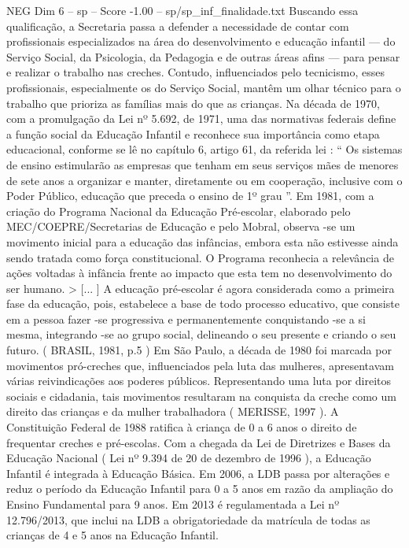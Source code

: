\begin{textsample}{NEG Dim 6 – sp – Score -1.00 – sp/sp\_inf\_finalidade.txt}
Buscando essa qualificação, a Secretaria passa a defender a necessidade de contar com profissionais especializados na área do desenvolvimento e educação infantil — do Serviço Social, da Psicologia, da Pedagogia e de outras áreas afins — para pensar e realizar o trabalho nas creches.
Contudo, influenciados pelo tecnicismo, esses profissionais, especialmente os do Serviço Social, mantêm um olhar técnico para o trabalho que prioriza as famílias mais do que as crianças.
Na década de 1970, com a promulgação da Lei nº 5.692, de 1971, uma das normativas federais define a função social da Educação Infantil e reconhece sua importância como etapa educacional, conforme se lê no capítulo 6, artigo 61, da referida lei : “ Os sistemas de ensino estimularão as empresas que tenham em seus serviços mães de menores de sete anos a organizar e manter, diretamente ou em cooperação, inclusive com o Poder Público, educação que preceda o ensino de 1º grau ”.
Em 1981, com a criação do Programa Nacional da Educação Pré-escolar, elaborado pelo MEC/COEPRE/Secretarias de Educação e pelo Mobral, observa -se um movimento inicial para a educação das infâncias, embora esta não estivesse ainda sendo tratada como força constitucional.
O Programa reconhecia a relevância de ações voltadas à infância frente ao impacto que esta tem no desenvolvimento do ser humano. > [... ] A educação pré-escolar é agora considerada como a primeira fase da educação, pois, estabelece a base de todo processo educativo, que consiste em a pessoa fazer -se progressiva e permanentemente conquistando -se a si mesma, integrando -se ao grupo social, delineando o seu presente e criando o seu futuro. ( BRASIL, 1981, p.5 ) Em São Paulo, a década de 1980 foi marcada por movimentos pró-creches que, influenciados pela luta das mulheres, apresentavam várias reivindicações aos poderes públicos.
Representando uma luta por direitos sociais e cidadania, tais movimentos resultaram na conquista da creche como um direito das crianças e da mulher trabalhadora ( MERISSE, 1997 ).
A Constituição Federal de 1988 ratifica à criança de 0 a 6 anos o direito de frequentar creches e pré-escolas.
Com a chegada da Lei de Diretrizes e Bases da Educação Nacional ( Lei nº 9.394 de 20 de dezembro de 1996 ), a Educação Infantil é integrada à Educação Básica.
Em 2006, a LDB passa por alterações e reduz o período da Educação Infantil para 0 a 5 anos em razão da ampliação do Ensino Fundamental para 9 anos.
Em 2013 é regulamentada a Lei nº 12.796/2013, que inclui na LDB a obrigatoriedade da matrícula de todas as crianças de 4 e 5 anos na Educação Infantil.

\end{textsample}
